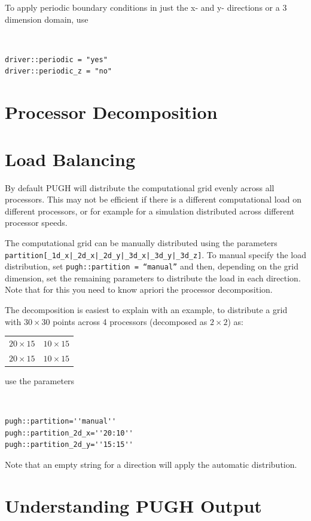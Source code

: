 \documentclass{article}
\begin{document}
To apply periodic boundary conditions in just the x- and y- directions or 
a 3 dimension domain, use

{\tt
\begin{verbatim}
driver::periodic = "yes"
driver::periodic_z = "no"
\end{verbatim}
}

\section{Processor Decomposition}

\section{Load Balancing}

By default PUGH will distribute the computational grid evenly across
all processors. This may not be efficient if there is a different
computational load on different processors, or for example for a simulation
distributed across different processor speeds. 

The computational grid can be manually distributed using the parameters
{\tt partition[\_1d\_x|\_2d\_x|\_2d\_y|\_3d\_x|\_3d\_y|\_3d\_z]}. To manual specify the 
load distribution, set {\tt pugh::partition = ``manual''} and then, 
depending on the grid dimension, set the remaining parameters 
to distribute the load in each direction. Note that for this you need
to know apriori the processor decomposition. 

The decomposition is easiest to explain with an example,
to distribute a grid with $30 \times 30$ points across
4 processors (decomposed as $2 \times 2$) as:

\begin{tabular}{cc}
$20\times 15$ & $10 \times 15$ \\
$20\times 15$ & $10 \times 15$ 
\end{tabular}

use the parameters

{\tt
\begin{verbatim}
pugh::partition=''manual''
pugh::partition_2d_x=''20:10''
pugh::partition_2d_y=''15:15''
\end{verbatim}
}


Note that an empty string for a direction will apply the automatic distribution.
\section{Understanding PUGH Output}
\end{document}
